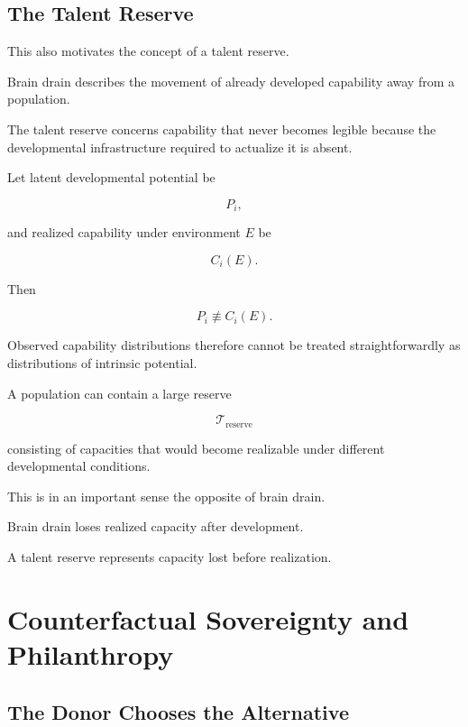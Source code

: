 \documentclass[11pt]{article}
\theoremstyle{remark}
\begin{document}
\subsection{The Talent Reserve}

This also motivates the concept of a talent reserve.

Brain drain describes the movement of already developed capability away from a population.

The talent reserve concerns capability that never becomes legible because the developmental infrastructure required to actualize it is absent.

Let latent developmental potential be

\begin{equation}
P_i,
\end{equation}

and realized capability under environment $E$ be

\begin{equation}
C_i(E).
\end{equation}

Then

\begin{equation}
P_i
\not\equiv
C_i(E).
\end{equation}

Observed capability distributions therefore cannot be treated straightforwardly as distributions of intrinsic potential.

A population can contain a large reserve

\begin{equation}
\mathcal{T}_{\mathrm{reserve}}
\end{equation}

consisting of capacities that would become realizable under different developmental conditions.

This is in an important sense the opposite of brain drain.

Brain drain loses realized capacity after development.

A talent reserve represents capacity lost before realization.

\section{Counterfactual Sovereignty and Philanthropy}

\subsection{The Donor Chooses the Alternative}
\end{document}
